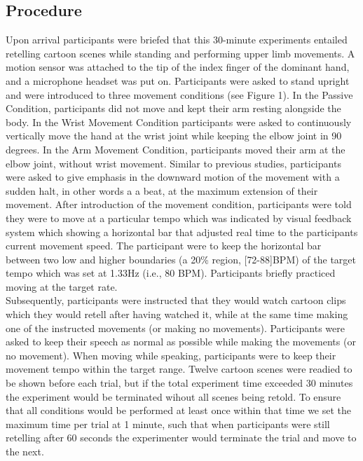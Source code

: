 \documentclass[
  man, noextraspace,floatsintext]{apa6}
\begin{document}
\hypertarget{procedure}{%
\subsection{Procedure}\label{procedure}}

Upon arrival participants were briefed that this 30-minute experiments entailed retelling cartoon scenes while standing and performing upper limb movements. A motion sensor was attached to the tip of the index finger of the dominant hand, and a microphone headset was put on. Participants were asked to stand upright and were introduced to three movement conditions (see Figure 1). In the Passive Condition, participants did not move and kept their arm resting alongside the body. In the Wrist Movement Condition participants were asked to continuously vertically move the hand at the wrist joint while keeping the elbow joint in 90 degrees. In the Arm Movement Condition, participants moved their arm at the elbow joint, without wrist movement. Similar to previous studies, participants were asked to give emphasis in the downward motion of the movement with a sudden halt, in other words a a beat, at the maximum extension of their movement.
After introduction of the movement condition, participants were told they were to move at a particular tempo which was indicated by visual feedback system which showing a horizontal bar that adjusted real time to the participants current movement speed. The participant were to keep the horizontal bar between two low and higher boundaries (a 20\% region, {[}72-88{]}BPM) of the target tempo which was set at 1.33Hz (i.e., 80 BPM). Participants briefly practiced moving at the target rate.\\
Subsequently, participants were instructed that they would watch cartoon clips which they would retell after having watched it, while at the same time making one of the instructed movements (or making no movements). Participants were asked to keep their speech as normal as possible while making the movements (or no movement). When moving while speaking, participants were to keep their movement tempo within the target range.
Twelve cartoon scenes were readied to be shown before each trial, but if the total experiment time exceeded 30 minutes the experiment would be terminated wihout all scenes being retold. To ensure that all conditions would be performed at least once within that time we set the maximum time per trial at 1 minute, such that when participants were still retelling after 60 seconds the experimenter would terminate the trial and move to the next.
\end{document}
